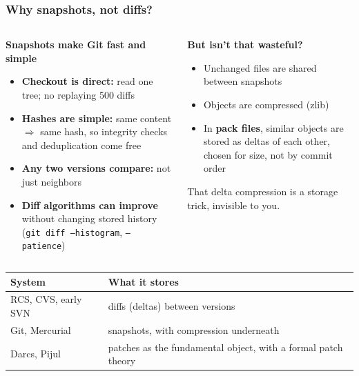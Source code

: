 \documentclass[aspectratio=169,10pt,compress]{beamer}
\newcommand{\cmd}[1]{\texttt{\color{gitred}#1}}
\begin{document}
\begin{frame}[t,fragile] \frametitle{Why snapshots, not diffs?}
  \begin{columns}[T]
    \begin{column}{0.5\textwidth}
      \textbf{Snapshots make Git fast and simple}
      \begin{itemize}\small
        \item \textbf{Checkout is direct:} read one tree; no replaying 500 diffs
        \item \textbf{Hashes are simple:} same content $\Rightarrow$ same hash,
              so integrity checks and deduplication come free
        \item \textbf{Any two versions compare:} not just neighbors
        \item \textbf{Diff algorithms can improve} without changing stored history
              (\cmd{git diff --histogram}, \cmd{--patience})
      \end{itemize}
    \end{column}
    \begin{column}{0.47\textwidth}
      \textbf{But isn't that wasteful?}
      \begin{itemize}\small
        \item Unchanged files are shared between snapshots
        \item Objects are compressed (zlib)
        \item In \textbf{pack files}, similar objects are stored as deltas of each other,
              chosen for size, not by commit order
      \end{itemize}
      \small That delta compression is a storage trick, invisible to you.
    \end{column}
  \end{columns}

  \vspace{0.5em}
  \small
  \begin{tabular}{@{}L{0.3\textwidth}L{0.62\textwidth}@{}}
    \toprule
    \textbf{System} & \textbf{What it stores} \\
    \midrule
    RCS, CVS, early SVN & diffs (deltas) between versions \\
    Git, Mercurial & snapshots, with compression underneath \\
    Darcs, Pijul & patches as the fundamental object, with a formal patch theory \\
    \bottomrule
  \end{tabular}
\end{frame}
\end{document}
